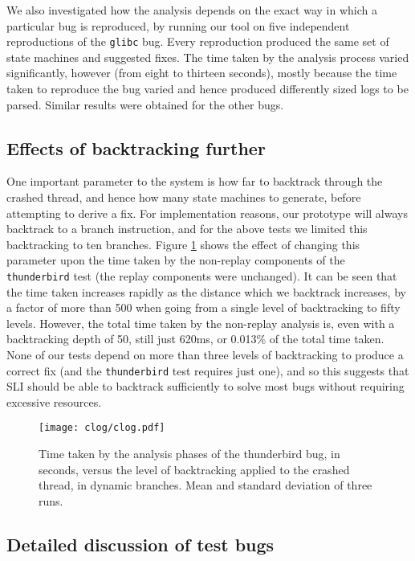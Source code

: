 \documentclass[10pt,twocolumn,preprint,natbib,authoryear]{sigplanconf}
\newcommand{\editorial}[1]{}
\begin{document}
We also investigated how the analysis depends on the exact way in 
which a particular bug is reproduced, by running our tool
on five independent reproductions of the \verb|glibc| bug.  Every
reproduction produced the same set of state machines and suggested
fixes.  The time taken by the analysis process varied significantly,
however (from eight to thirteen seconds), mostly because the time
taken to reproduce the bug varied and hence produced differently sized
logs to be parsed. Similar results were obtained for the other
bugs.\editorial{Not sure this is all that interesting, or that I've
  phrased it very well...}

\subsection{Effects of backtracking further}
\label{sect:eval:backtrack}

One important parameter to the system is how far to backtrack through
the crashed thread, and hence how many state machines to generate,
before attempting to derive a fix.  For implementation reasons, our
prototype will always backtrack to a branch instruction, and for the
above tests we limited this backtracking to ten branches.  Figure
\ref{fig:eval:backtrack} shows the effect of changing this parameter
upon the time taken by the non-replay components of the
\verb|thunderbird| test (the replay components were unchanged).  It
can be seen that the time taken increases rapidly as the distance
which we backtrack increases, by a factor of more than 500 when going
from a single level of backtracking to fifty levels.  However, the
total time taken by the non-replay analysis is, even with a
backtracking depth of 50, still just 620ms, or 0.013\% of the total
time taken.  None of our tests depend on more than three levels of
backtracking to produce a correct fix (and the \verb|thunderbird| test
requires just one), and so this suggests that SLI should be able to
backtrack sufficiently to solve most bugs without requiring excessive
resources.

\begin{figure}
\texttt{[image: clog/clog.pdf]}
\caption{Time taken by the analysis phases of the thunderbird bug, in
  seconds, versus the level of backtracking applied to the crashed
  thread, in dynamic branches.  Mean and standard deviation of three
  runs.}
\label{fig:eval:backtrack}
\end{figure}


\subsection{Detailed discussion of test bugs}
\label{sect:bug_descr}
\end{document}

